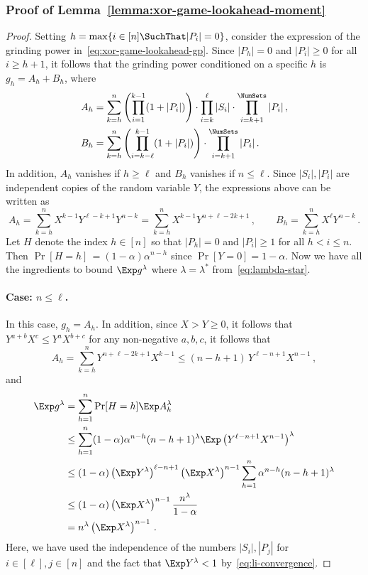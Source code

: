 \subsubsection*{Proof of Lemma~\ref{lemma:xor-game-lookahead-moment}}
\begin{proof}
Setting $h = \max\{i \in [n] \SuchThat |P_i| = 0\}$, 
consider the expression of the grinding power in~\ref{eq:xor-game-lookahead-gp}. 
Since $|P_h| = 0$ and $|P_i| \geq 0$ for all $i \geq h+1$, it follows that 
the grinding power conditioned on a specific $h$ is
$g_h = A_h + B_h$, where
\begin{align*}
    A_h &= \sum_{k=h}^n 
        \left(\prod_{i=1}^{k-1}(1 + |P_i|)\right) \cdot  
        \prod_{i=k}^\ell |S_i| \cdot 
        \prod_{i=k+1}^\NumSets |P_i| \,,
         \nonumber \\
    B_h &= \sum_{k=h}^n 
        \left(\prod_{i=k - \ell}^{k-1}(1 + |P_i|)\right) \cdot
        \prod_{i=k+1}^\NumSets |P_i|
    \,.
\end{align*}
In addition, $A_h$ vanishes if $h \geq \ell$ and $B_h$ vanishes if $n \leq \ell$. 
Since $|S_i|, |P_i|$ are independent copies of the random variable $Y$, the expressions above can be written as
\[
    A_h = \sum_{k=h}^n 
        X^{k-1} Y^{\ell - k + 1} Y^{n - k} 
        = \sum_{k=h}^n X^{k-1} Y^{n + \ell - 2k + 1}
        \,,\qquad
    B_h = \sum_{k=h}^n 
        X^\ell Y^{n - k}
    \,.
\]
Let $H$ denote the index $h \in [n]$ so that $|P_h| = 0$ and $|P_i| \geq 1$ for all $h < i \leq n$. 
Then $\Pr[H = h]\, = (1-\alpha) \alpha^{n-h}$ since $\Pr[Y = 0] = 1 - \alpha$. 
Now we have all the ingredients to bound $\Exp g^\lambda$ where $\lambda = \lambda^*$ from~\eqref{eq:lambda-star}. 

\paragraph{Case: $n \leq \ell$.}
In this case, $g_h = A_h$. 
In addition, since $X > Y \geq 0$, it follows that $Y^{a+b} X^c \leq Y^a X^{b+c}$ 
for any non-negative $a,b,c$, it follows that
\[
    A_h = \sum_{k=h}^n Y^{n+\ell-2k+1} X^{k-1} \leq (n - h + 1)\, Y^{\ell - n + 1} X^{n-1}\,,
\]
and
\begin{align*}
    \Exp g^\lambda 
        &= \sum_{h=1}^n \Pr[H = h] \Exp A_h^\lambda \\
        &\leq \sum_{h=1}^n (1-\alpha) \alpha^{n-h} (n - h + 1)^\lambda \Exp \left(Y^{\ell - n + 1} X^{n-1}\right)^\lambda \\
        &\leq  (1-\alpha)  \left(\Exp Y^\lambda\right)^{\ell - n + 1} \left(\Exp X^\lambda \right)^{n-1} 
            \sum_{h=1}^n \alpha^{n-h} (n - h + 1)^\lambda \\
        &\leq  (1-\alpha)  \left(\Exp X^\lambda \right)^{n-1} 
            \frac{n^\lambda}{1-\alpha} \\
        &= n^\lambda \left(\Exp X^\lambda \right)^{n-1} \,.
\end{align*}
Here, we have used the independence of the numbers $|S_i|, |P_j|$ for $i \in [\ell], j \in [n]$ 
and the fact that $\Exp Y^\lambda < 1$ by~\eqref{eq:li-convergence}.


\end{proof}
